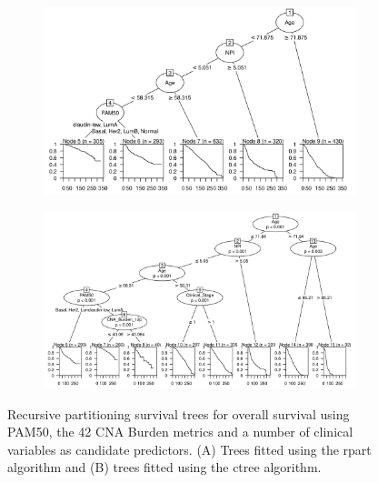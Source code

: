 \begin{figure}[!htb]
\centering

\vspace{1cm}

\begin{subfigure}{\textwidth}
\subcaption{}
\includegraphics[width=1\textwidth]{../figures/Appendices/Appendix_B/Clin_PA_PartyKit_Survival_Burden_OS_PAM50.png}
\end{subfigure}

\vspace{2cm}

\begin{subfigure}{\textwidth}
\subcaption{}
\includegraphics[width=1\textwidth]{../figures/Appendices/Appendix_B/Clin_PA_Ctree_Survival_Burden_OS_PAM50.png}
\end{subfigure}

\vspace{1cm}

\caption[Recursive partitioning survival trees for overall survival using PAM50, the 42 CNA Burden metrics and a number of clinical variables as candidate predictors.]{Recursive partitioning survival trees for overall survival using PAM50, the 42 CNA Burden metrics and a number of clinical variables as candidate predictors. (A) Trees fitted using the rpart algorithm and (B) trees fitted using the ctree algorithm.}
\end{figure}

